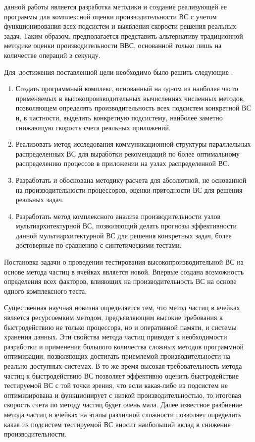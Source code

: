 {\aim} данной работы является разработка методики и создание реализующей ее программы для комплексной оценки производительности ВС с учетом функционирования всех подсистем  и выявления скорости решения реальных задач. Таким образом, предполагается представить альтернативу традиционной методике оценки производительности ВВС, основанной только лишь на количестве операций в секунду.  

Для~достижения поставленной цели необходимо было решить следующие {\tasks}:
\begin{enumerate}
	\item Создать программный комплекс, основанный на одном из наиболее часто применяемых в высокопроизводительных вычислениях численных методов, позволяющем определять производительность всех подсистем конкретной ВС и, в частности, выделить конкретную подсистему, наиболее заметно снижающую скорость счета реальных приложений. 
	
	\item Реализовать метод исследования коммуникационной структуры параллельных распределенных ВС для выработки рекомендаций по более оптимальному распределению процессов в приложении на узлах распределенной ВС.
	
	\item Разработать и обоснована методику расчета для абсолютной, не основанной на производительности процессоров, оценки пригодности ВС для решения реальных задач. 
	
	\item Разработать метод комплексного анализа производительности узлов мультиархитектурной ВС, позволяющий делать прогнозы эффективности данной мультиархитектурной ВС для решения конкретных задач, более достоверные по сравнению с синтетическими тестами.
\end{enumerate}

{\novelty}
Постановка задачи о проведении тестирования высокопроизводительной ВС на основе метода частиц в ячейках является новой. Впервые создана возможность определения всех факторов, влияющих на производительность ВС на основе одного комплексного теста. 

Существенная научная новизна определяется тем, что метод частиц в ячейках является ресурсоемким методом, предъявляющим высокие требования к быстродействию не только процессора, но и оперативной памяти, и системы хранения данных. Эти свойства метода частиц приводят к необходимости разработки и применения большого количества сложных методов программной оптимизации, позволяющих достигать приемлемой производительности на реально доступных системах. В то же время высокая требовательность метода частиц к быстродействию ВС позволяет эффективно оценить быстродействие тестируемой ВС с той точки зрения, что если какая-либо из подсистем не оптимизирована и функционирует с низкой производительностью, то итоговая скорость счета по методу частиц будет очень мала. Далее известное разбиение метода частиц в ячейках на этапы различной сложности позволяет определить какая из подсистем тестируемой ВС вносит наибольший вклад в снижение производительности. 


